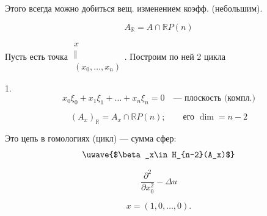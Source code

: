 Этого всегда можно добиться вещ. изменением коэфф. (небольшим).



\begin{equation*}A_{\mathbb R}=A\cap\mathbb RP(n)\end{equation*}



Пусть есть точка $\begin{gathered}x\\\Vert\\(x_0,\ldots,x_n)\end{gathered}$.
Построим по ней 2 цикла



1.
\begin{equation*}x_0\xi_0+x_1\xi_1+\ldots+x_n\xi_n=0\quad\text{--- плоскость (компл.)}\end{equation*}











\begin{equation*}(A_x)_{\mathbb R}=A_x\cap\mathbb RP(n);\qquad\text{его }\dim=n-2\end{equation*}



Это цепь в гомологиях (цикл) --- сумма сфер:
\begin{equation*}\text{\uwave{$\beta_x\in H_{n-2}(A_x)$}}\end{equation*}






\begin{equation*}\frac{\partial^2}{\partial x_0^2}-\Delta u\end{equation*}



\begin{equation*}x=(1,0,\ldots,0).\end{equation*}



